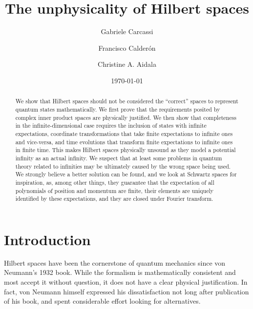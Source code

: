 \documentclass[10pt,twocolumn, nofootinbib]{revtex4-2}
\begin{document}
\title{The unphysicality of Hilbert spaces}
\author{Gabriele Carcassi}
\author{Francisco Calder\'on}
\author{Christine A. Aidala}

\date{\today}


\begin{abstract}
We show that Hilbert spaces should not be considered the ``correct'' spaces to represent quantum states mathematically. We first prove that the requirements posited by complex inner product spaces are physically justified. We then show that completeness in the infinite-dimensional case requires the inclusion of states with infinite expectations, coordinate transformations that take finite expectations to infinite ones and vice-versa, and time evolutions that transform finite expectations to infinite ones in finite time. This makes Hilbert spaces physically unsound as they model a potential infinity as an actual infinity. We suspect that at least some problems in quantum theory related to infinities may be ultimately caused by the wrong space being used. We strongly believe a better solution can be found, and we look at Schwartz spaces for inspiration, as, among other things, they guarantee that the expectation of all polynomials of position and momentum are finite, their elements are uniquely identified by these expectations, and they are closed under Fourier transform.
\end{abstract}

\maketitle

\section{Introduction}

Hilbert spaces have been the cornerstone of quantum mechanics since von Neumann's 1932 book.\cite{von_neumann_mathematische_1996} While the formalism is mathematically consistent and most accept it without question, it does not have a clear physical justification.\cite{heathcote_1990, hardy_2001} In fact, von Neumann himself expressed his dissatisfaction not long after publication of his book, and spent considerable effort looking for alternatives.\cite{vonNeumannHilbert_1996}
\end{document}
